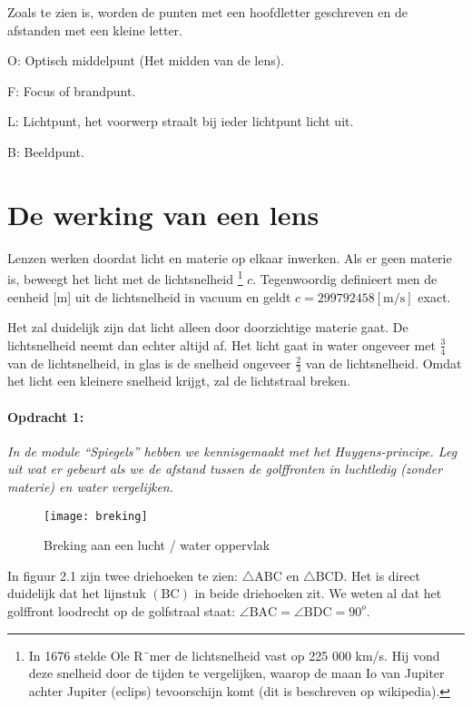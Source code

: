Zoals te zien is, worden de punten met een hoofdletter geschreven
en de afstanden met een kleine letter.\medskip{}


\qquad{}O: Optisch middelpunt (Het midden van de lens).

\qquad{}F: Focus of brandpunt.

\qquad{}L: Lichtpunt, het voorwerp straalt bij ieder lichtpunt licht
uit.

\qquad{}B: Beeldpunt.\newpage{}


\section{De werking van een lens}

Lenzen werken doordat licht en materie op elkaar inwerken. Als er geen
materie is, beweegt het licht met de lichtsnelheid \footnote{In 1676
stelde Ole R¯mer de lichtsnelheid vast op 225 000 km/s. Hij vond deze
snelheid door de tijden te vergelijken, waarop de maan Io van Jupiter
achter Jupiter (eclips) tevoorschijn komt (dit is beschreven op
wikipedia). } $c$. Tegenwoordig definieert men de eenheid {[}m{]} uit de
lichtsnelheid in vacuum en geldt $c=299792458\mathrm{[m/s]}$ exact.

Het zal duidelijk zijn dat licht alleen door doorzichtige materie
gaat. De lichtsnelheid neemt dan echter altijd af. Het licht gaat
in water ongeveer met $\frac{3}{4}$ van de lichtsnelheid, in glas
is de snelheid ongeveer $\frac{2}{3}$ van de lichtsnelheid. Omdat
het licht een kleinere snelheid krijgt, zal de lichtstraal breken.


\paragraph*{Opdracht 1:}

\emph{In de module ``Spiegels'' hebben we kennisgemaakt met het
Huygens-principe. Leg uit wat er gebeurt als we de afstand tussen
de golffronten in luchtledig (zonder materie) en water vergelijken.}

\begin{figure}[H]
\noindent \begin{centering}
\texttt{[image: breking]}
\par\end{centering}

\caption{Breking aan een lucht / water oppervlak}
\end{figure}


In figuur 2.1 zijn twee driehoeken te zien: $\triangle\mathrm{ABC}$
en $\triangle\mathrm{BCD}$. Het is direct duidelijk dat het lijnstuk
$(\mathrm{BC})$ in beide driehoeken zit. We weten al dat het golffront
loodrecht op de golfstraal staat: $\angle\mathrm{BAC}=\angle\mathrm{BDC}=90^{o}$.


